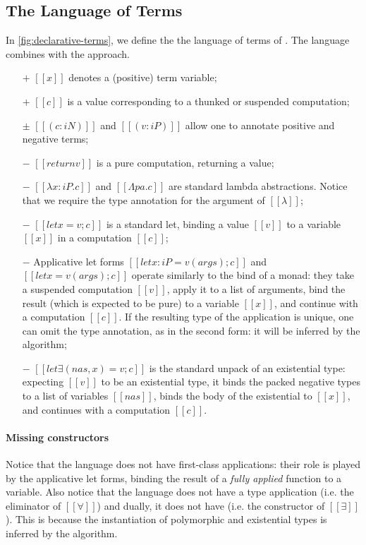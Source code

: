 \subsection{The Language of Terms}

In \cref{fig:declarative-terms}, we define the the language of terms of 
\fexists. The language combines \systemf with the \CBPV approach.

\begin{itemize}
    \item [$+$] $[[x]]$ denotes a (positive) term variable; 
    \item [$+$] $[[{c}]]$ is a value corresponding to a thunked 
        or suspended computation;
    \item [$\pm$] $[[(c : iN)]]$ and $[[(v : iP)]]$ allow one to annotate 
        positive and negative terms;
    \item [$-$] $[[return v]]$ is a pure computation, returning a value;
    \item [$-$] $[[λ x : iP . c]]$ and $[[Λ pa . c]]$
        are standard lambda abstractions. Notice that we require
        the type annotation for the argument of $[[λ]]$;
    \item [$-$] $[[ let x = v ; c]]$ is a standard let, binding
        a value $[[v]]$ to a variable $[[x]]$ in a computation $[[c]]$;
    \item [$-$] Applicative let forms $[[let x : iP = v ( args ) ; c]]$ and
        $[[let x = v ( args ) ; c]]$ operate similarly to 
        the bind of a monad: they take a suspended computation $[[v]]$,
        apply it to a list of arguments, bind the result 
        (which is expected to be pure) to a variable $[[x]]$,
        and continue with a computation $[[c]]$.
        If the resulting type of the application is unique, 
        one can omit the type annotation, as in the second form:
        it will be inferred by the algorithm;
    \item [$-$] $[[let∃ ( nas , x ) = v ; c]]$
        is the standard unpack of an existential type:
        expecting $[[v]]$ to be an existential type,
        it binds the packed negative types to a list of 
        variables $[[nas]]$, binds the body of the existential
        to $[[x]]$, and continues with a computation $[[c]]$.
\end{itemize}

\paragraph{Missing constructors}
Notice that the language does not have first-class applications: 
their role is played by the applicative let forms, binding 
the result of a \emph{fully applied} function to a variable.
Also notice that the language does not have a type application 
(i.e. the eliminator of $[[∀]]$) and dually, 
it does not have \pack (i.e. the constructor of $[[∃]]$).
This is because the instantiation of polymorphic and existential 
types is inferred by the algorithm.  

